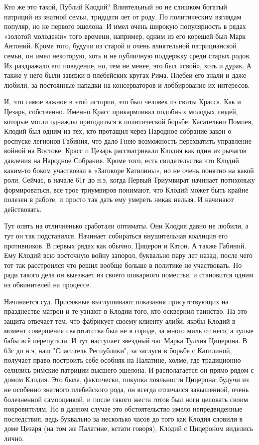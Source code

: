 Кто же это такой, Публий Клодий? Влиятельный но не слишком богатый патриций из знатной семьи, тридцати лет от роду. По политическим взглядам популяр, но не первого эшелона. И имел очень широкую популярность в рядах «золотой молодежи» того времени, например, одним из его корешей был Марк Антоний. Кроме того, будучи из старой и очень влиятельной патрицианской семьи, он имел некоторую, хоть и не публичную поддержку среди старых родов. Их раздражало его поведение, но, тем не менее, это был «свой», хоть и дурак. А также у него были завязки в плебейских кругах Рима. Плебеи его знали и даже любили, за постоянные нападки на консерваторов и лоббирование их интересов.


И, что самое важное в этой истории, это был человек из свиты Красса. Как и Цезарь, собственно. Именно Красс прикармливал подобных молодых людей, которые могли однажды пригодиться в политической борьбе. Касательно Помпея, Клодий был одним из тех, кто протащил через Народное собрание закон о роспуске легионов Габиния, что дало Гнею возможность перехватить управление войной на Востоке. Красс и Цезарь рассматривали Клодия как один из рычагов давления на Народное Собрание. Кроме того, есть свидетельства что Клодий каким-то боком участвовал в «Заговоре Катилины», но не очень понятно на какой роли. Сейчас, в начале 61г до н.э, когда Первый Триумвират начинает потихоньку формироваться, все трое триумвиров понимают, что Клодий может быть крайне полезен в работе, и просто так дать ему умереть никак нельзя. И начинают действовать.


Тут опять на отличненько сработали оптиматы. Они Клодия давно не любили, а тут он так подставился. Начинает собираться внушительная коалиция его противников. В первых рядах как обычно, Цицерон и Катон. А также Габиний. Ему Клодий всю восточную войну запорол, буквально пару лет назад, после чего тот так расстроился что решил вообще больше в политике не участвовать. Но ради такого дела он выезжает из своего шикарного поместья, и становится одним из обвинителей на процессе.


Начинается суд. Присяжные выслушивают показания присутствующих на празднестве матрон и те узнают в Клодии того, кто осквернил таинство. На это защита отвечает тем, что фабрикует своему клиенту алиби, якобы Клодий в момент совершения святотатства был не в городе, за много миль от него, а тупые бабы всё перепутали. И тут наступает звездный час Марка Туллия Цицерона. В 63г до н.э, наш "Спаситель Республики", за заслуги в борьбе с Катилиной, получает право построить себе особняк на Палатине, холме, где традиционно селились римские патриции высшего эшелона. И располагается он прямо рядом с домом Клодия. Это была, фактически, покупка лояльности Цицерона: будучи из не особенно знатного плебейского рода, он всегда отличался завышенной, очень болезненной самооценкой, и после такого жеста готов был ноги целовать своим покровителям. Но в данном случае это обстоятельство имело непредвиденные последствия, ведь буквально за несколько часов до того как Клодия словили в доме Цезаря (на том же Палатине, кстати говоря), Клодий с Цицероном виделись лично.


